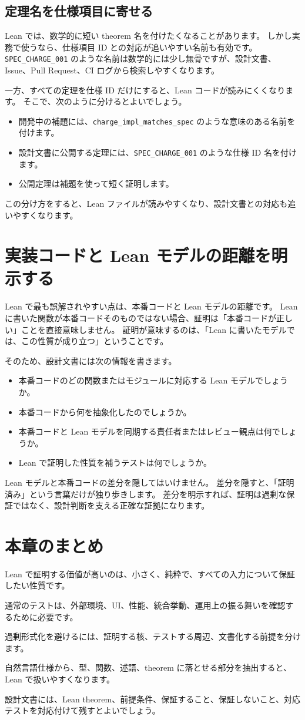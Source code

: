 \subsection{定理名を仕様項目に寄せる}

Lean では、数学的に短い theorem 名を付けたくなることがあります。
しかし実務で使うなら、仕様項目 ID との対応が追いやすい名前も有効です。
\texttt{SPEC\_CHARGE\_001} のような名前は数学的には少し無骨ですが、設計文書、Issue、Pull Request、CI ログから検索しやすくなります。

一方、すべての定理を仕様 ID だけにすると、Lean コードが読みにくくなります。
そこで、次のように分けるとよいでしょう。

\begin{itemize}
\item 開発中の補題には、\texttt{charge\_impl\_matches\_spec} のような意味のある名前を付けます。
\item 設計文書に公開する定理には、\texttt{SPEC\_CHARGE\_001} のような仕様 ID 名を付けます。
\item 公開定理は補題を使って短く証明します。
\end{itemize}

この分け方をすると、Lean ファイルが読みやすくなり、設計文書との対応も追いやすくなります。

\section{実装コードと Lean モデルの距離を明示する}

Lean で最も誤解されやすい点は、本番コードと Lean モデルの距離です。
Lean に書いた関数が本番コードそのものではない場合、証明は「本番コードが正しい」ことを直接意味しません。
証明が意味するのは、「Lean に書いたモデルでは、この性質が成り立つ」ということです。

そのため、設計文書には次の情報を書きます。

\begin{itemize}
\item 本番コードのどの関数またはモジュールに対応する Lean モデルでしょうか。
\item 本番コードから何を抽象化したのでしょうか。
\item 本番コードと Lean モデルを同期する責任者またはレビュー観点は何でしょうか。
\item Lean で証明した性質を補うテストは何でしょうか。
\end{itemize}

Lean モデルと本番コードの差分を隠してはいけません。
差分を隠すと、「証明済み」という言葉だけが独り歩きします。
差分を明示すれば、証明は過剰な保証ではなく、設計判断を支える正確な証拠になります。

\section{本章のまとめ}

Lean で証明する価値が高いのは、小さく、純粋で、すべての入力について保証したい性質です。

通常のテストは、外部環境、UI、性能、統合挙動、運用上の振る舞いを確認するために必要です。

過剰形式化を避けるには、証明する核、テストする周辺、文書化する前提を分けます。

自然言語仕様から、型、関数、述語、theorem に落とせる部分を抽出すると、Lean で扱いやすくなります。

設計文書には、Lean theorem、前提条件、保証すること、保証しないこと、対応テストを対応付けて残すとよいでしょう。

